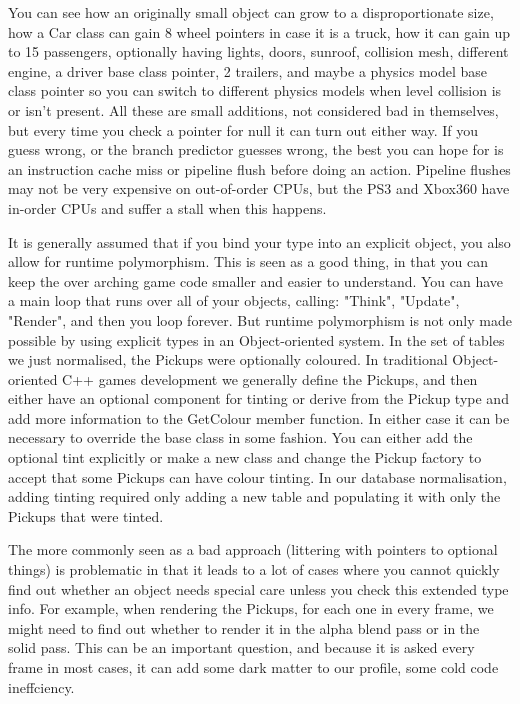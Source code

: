 You can see how an originally small object can grow to a disproportionate size,
how a Car class can gain 8 wheel pointers in case it is a truck, how it can
gain up to 15 passengers, optionally having lights, doors, sunroof, collision
mesh, different engine, a driver base class pointer, 2 trailers, and maybe a
physics model base class pointer so you can switch to different physics models
when level collision is or isn't present. All these are small additions, not
considered bad in themselves, but  every time you check a pointer for null it
can turn out either way.  If you guess wrong, or the branch predictor guesses
wrong, the best you can hope for is an instruction cache miss or pipeline flush
before doing an action. Pipeline flushes may not be very expensive on
out-of-order CPUs, but the PS3 and Xbox360 have in-order CPUs and suffer a
stall when this happens.

It is generally assumed that if you bind your type into an explicit object, you
also allow for runtime polymorphism. This is seen as a good thing, in that you
can keep the over arching game code smaller and easier to understand.  You can
have a main loop that runs over all of your objects, calling: "Think",
"Update", "Render", and then you loop forever. But runtime polymorphism is not
only made possible by using explicit types in an Object-oriented system. In the
set of tables we just normalised, the Pickups were optionally coloured. In
traditional Object-oriented C++ games development we generally define the
Pickups, and then either have an optional component for tinting or derive from
the Pickup type and add more information to the GetColour member function. In
either case it can be necessary to override the base class in some fashion. You
can either add the optional tint explicitly or make a new class and change the
Pickup factory to accept that some Pickups can have colour tinting. In our
database normalisation, adding tinting required only adding a new table and
populating it with only the Pickups that were tinted.

The more commonly seen as a bad approach (littering with pointers to optional
things) is problematic in that it leads to a lot of cases where you cannot
quickly find out whether an object needs special care unless you check this
extended type info. For example, when rendering the Pickups, for each one in
every frame, we might need to find out whether to render it in the alpha blend
pass or in the solid pass. This can be an important question, and because it is
asked every frame in most cases, it can add some dark matter to our profile,
some cold code ineffciency.

